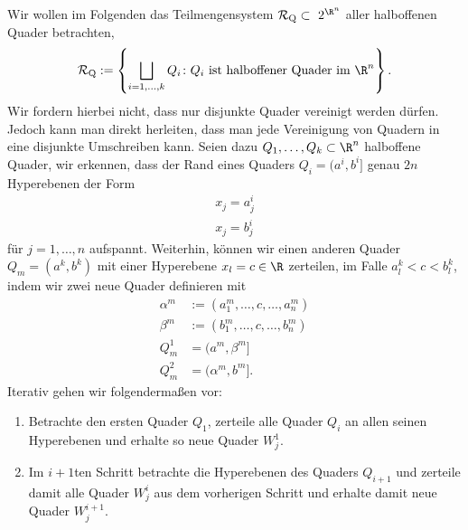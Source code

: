 \documentclass[letterpaper,10pt,german]{jupyterBook}
\begin{document}
\sphinxAtStartPar
Wir wollen im Folgenden das Teilmengensystem \(\mathcal{R}_{\text{Q}}\subset\ 2^{\R^n}\) aller halboffenen Quader betrachten,
\begin{equation*}
\begin{split}\mathcal{R}_{\text{Q}} := \left\{ \bigsqcup_{i=1,\ldots,k} Q_i \colon Q_i \text{ ist halboffener Quader im } \R^n \right\}.\end{split}
\end{equation*}
\sphinxAtStartPar
Wir fordern hierbei nicht, dass nur disjunkte Quader vereinigt werden dürfen. Jedoch kann man direkt herleiten, dass man jede Vereinigung von Quadern in eine disjunkte Umschreiben kann. Seien dazu \(Q_1,\ldots,Q_k\subset\R^n\) halboffene Quader, wir erkennen, dass der Rand eines Quaders \(Q_i=(a^i,b^i]\) genau \(2n\) Hyperebenen der Form
\begin{equation*}
\begin{split}x_j = a^i_j\\
x_j = b^i_j\end{split}
\end{equation*}
\sphinxAtStartPar
für \(j=1,\ldots,n\) aufspannt. Weiterhin, können wir einen anderen Quader \(Q_m=(a^k,b^k)\) mit einer Hyperebene \(x_l=c\in\R\) zerteilen, im Falle \(a^k_l < c < b^k_l\), indem wir zwei neue Quader definieren mit
\begin{equation*}
\begin{split}\alpha^m&:=(a^m_1,\ldots,c,\ldots,a^m_n)\\
\beta^m&:=(b^m_1,\ldots,c,\ldots,b^m_n)\\
Q_m^1&=(a^m,\beta^m]\\
Q_m^2&=(\alpha^m,b^m].\end{split}
\end{equation*}
\sphinxAtStartPar
Iterativ gehen wir folgendermaßen vor:
\begin{enumerate}
%
\item {} 
\sphinxAtStartPar
Betrachte den ersten Quader \(Q_1\), zerteile alle Quader \(Q_i\) an allen seinen Hyperebenen und erhalte so neue Quader \(W^1_j\).

\item {} 
\sphinxAtStartPar
Im \(i+1\)ten Schritt betrachte die Hyperebenen des Quaders \(Q_{i+1}\) und zerteile damit alle Quader \(W^i_j\) aus dem vorherigen Schritt und erhalte damit neue Quader \(W^{i+1}_j\).

\end{enumerate}
\end{document}
